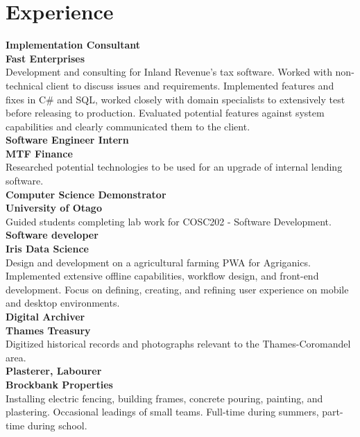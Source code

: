 \documentclass[lighthipster]{simplehipstercv}
\begin{document}
    \begin{minipage}[t]{1\textwidth}
    \section*{Experience}
    
    \textbf{Implementation Consultant}\\
    \textbf{Fast Enterprises}
    \\
    Development and consulting for Inland Revenue's tax software. 
        Worked with non-technical client to discuss issues and requirements. 
        Implemented features and fixes in C\# and SQL, worked closely with domain specialists to extensively test before releasing to production.
        Evaluated potential features against system capabilities and clearly communicated them to the client. \\
    
    \textbf{Software Engineer Intern}\\
    \textbf{MTF Finance}
    \\
    Researched potential technologies to be used for an upgrade of internal lending software.\\
    
    \textbf{Computer Science Demonstrator}\\
    \textbf{University of Otago}
    \\
    Guided students completing lab work for COSC202 - Software Development.\\
    
    \textbf{Software developer}\\
    \textbf{Iris Data Science}
    \\
    Design and development on a agricultural farming PWA for Agriganics. 
        Implemented extensive offline capabilities, workflow design, and front-end development. 
        Focus on defining, creating, and refining user experience on mobile and desktop environments.\\
    
    \textbf{Digital Archiver}\\
    \textbf{Thames Treasury}
    \\
    Digitized historical records and photographs relevant to the Thames-Coromandel area.\\
    
    \textbf{Plasterer, Labourer}\\
    \textbf{Brockbank Properties}
    \\
    Installing electric fencing, building frames, concrete pouring, painting, and plastering. Occasional leadings of small teams. Full-time during summers, part-time during school.\\
      
    \end{minipage}    
    \bigskip
    
\end{document}

